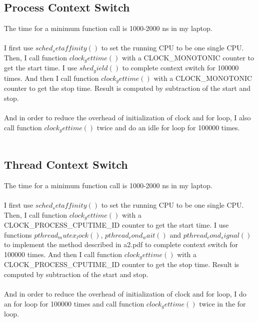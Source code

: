 \documentclass[a4paper,openany,10.5pt]{article}
\begin{document}
	\subsection{Process Context Switch}
	The time for a minimum function call is 1000-2000 ns in my laptop.
	\\ \\
	I first use $sched_setaffinity()$ to set the running CPU to be one single CPU. Then, I call function $clock_gettime()$ with a CLOCK\_MONOTONIC counter to get the start time. I use $shed_yield()$ to complete context switch for 100000 times. And then I call function $clock_gettime()$ with a CLOCK\_MONOTONIC counter to get the stop time. Result is computed by subtraction of the start and stop.
	\\ \\
	And in order to reduce the overhead of initialization of clock and for loop, I also call function $clock_gettime()$ twice and do an idle for loop for 100000 times.
	\\ \\
	\subsection{Thread Context Switch}
	The time for a minimum function call is 1000-2000 ns in my laptop.
	\\ \\ 
	I first use $sched_setaffinity()$ to set the running CPU to be one single CPU. Then, I call function $clock_gettime()$ with a CLOCK\_PROCESS\_CPUTIME\_ID counter to get the start time. I use functions $pthread_mutex_lock()$, $pthread_cond_wait()$ and $pthread_cond_signal()$ to implement the method described in a2.pdf to complete context switch for 100000 times. And then I call function $clock_gettime()$ with a CLOCK\_PROCESS\_CPUTIME\_ID counter to get the stop time. Result is computed by subtraction of the start and stop.
	\\ \\
	And in order to reduce the overhead of initialization of clock and for loop, I do an for loop for 100000 times and call function $clock_gettime()$ twice in the for loop.
	\\ \\
			
\end{document}
